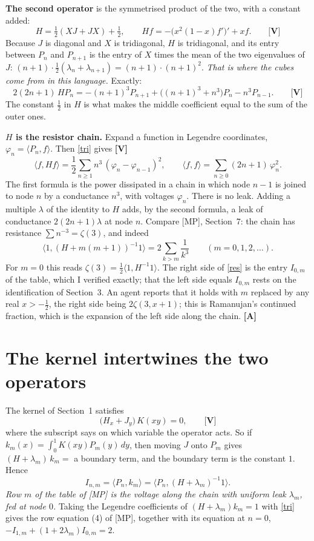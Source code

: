 \documentclass[11pt]{article}
\newcommand{\ip}[2]{\langle #1,#2\rangle}
\newcommand{\q}[1]{\medskip\noindent\textbf{#1}}
\begin{document}
\q{The second operator} is the symmetrised product of the two, with a constant added:
\[
H=\tfrac12(XJ+JX)+\tfrac12,\qquad Hf=-\bigl(x^2(1-x)f'\bigr)'+xf.\qquad\textbf{[V]}
\]
Because $J$ is diagonal and $X$ is tridiagonal, $H$ is tridiagonal, and its entry between $P_n$ and
$P_{n+1}$ is the entry of $X$ times the mean of the two eigenvalues of $J$:
$(n+1)\cdot\frac12(\lambda_n+\lambda_{n+1})=(n+1)\cdot(n+1)^2$. \emph{That is where the cubes come
from in this language.} Exactly:
\begin{equation}\label{tri}
2(2n+1)\,HP_n=-(n+1)^3P_{n+1}+\bigl((n+1)^3+n^3\bigr)P_n-n^3P_{n-1}.\qquad\textbf{[V]}
\end{equation}
The constant $\frac12$ in $H$ is what makes the middle coefficient equal to the sum of the outer
ones.

\q{$H$ is the resistor chain.} Expand a function in Legendre coordinates, $\varphi_n=\ip{P_n}f$.
Then \eqref{tri} gives \textbf{[V]}
\[
\ip f{Hf}=\frac12\sum_{n\ge1}n^3\,(\varphi_n-\varphi_{n-1})^2,\qquad
\ip ff=\sum_{n\ge0}(2n+1)\,\varphi_n^2 .
\]
The first formula is the power dissipated in a chain in which node $n-1$ is joined to node $n$ by a
conductance $n^3$, with voltages $\varphi_n$. There is no leak. Adding a multiple $\lambda$ of the
identity to $H$ adds, by the second formula, a leak of conductance $2(2n+1)\lambda$ at node $n$.
Compare [MP], Section~7: the chain has resistance $\sum n^{-3}=\zeta(3)$, and indeed
\begin{equation}\label{res}
\ip1{(H+m(m+1))^{-1}1}=2\sum_{k>m}\frac1{k^3}\qquad(m=0,1,2,\dots).
\end{equation}
For $m=0$ this reads $\zeta(3)=\frac12\ip1{H^{-1}1}$. The right side of \eqref{res} is the entry
$I_{0,m}$ of the table, which I verified exactly; that the left side equals $I_{0,m}$ rests on the
identification of Section~3. An agent reports that it holds with $m$ replaced by any real
$x>-\frac12$, the right side being $2\zeta(3,x+1)$; this is Ramanujan's continued fraction, which
is the expansion of the left side along the chain. \textbf{[A]}

\section{The kernel intertwines the two operators}

The kernel of Section~1 satisfies
\begin{equation}\label{int}
\bigl(H_x+J_y\bigr)\,K(xy)=0 ,\qquad\textbf{[V]}
\end{equation}
where the subscript says on which variable the operator acts. So if $k_m(x)=\int_0^1K(xy)P_m(y)\,dy$,
then moving $J$ onto $P_m$ gives $(H+\lambda_m)\,k_m=$ a boundary term, and the boundary term is the
constant $1$. Hence
\[
I_{n,m}=\ip{P_n}{k_m}=\ip{P_n}{(H+\lambda_m)^{-1}1} .
\]
\emph{Row $m$ of the table of [MP] is the voltage along the chain with uniform leak $\lambda_m$, fed
at node $0$.} Taking the Legendre coefficients of $(H+\lambda_m)k_m=1$ with \eqref{tri} gives the
row equation (4) of [MP], together with its equation at $n=0$,
$-I_{1,m}+(1+2\lambda_m)I_{0,m}=2$.
\end{document}
